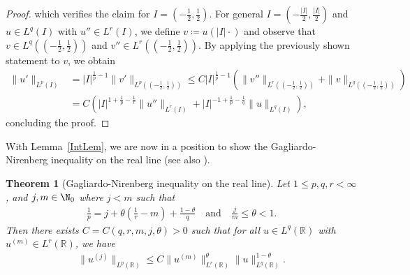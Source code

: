 \documentclass{article}
\numberwithin{figure}{section}
\newcommand{\R}{\mathbb{R}}
\newtheorem{theorem}{Theorem}[section]
\numberwithin{equation}{section}
\begin{document}
\begin{proof}
which verifies the claim for $I=(-\frac 12 , \frac 12)$. For general $I=(-\frac {|I|}{2}, \frac{|I|}{2})$ and $u \in L^q(I)$ with $u'' \in L^{r}(I)$, we define $v \coloneq  u({|I|} \cdot)$ and observe that $v \in L^q((-\frac 12 , \frac 12))$ and $v'' \in L^{r}((-\frac 12 , \frac 12))$. By applying the previously shown statement to $v$, we obtain
\begin{align} 
    \|u'\|_{L^p(I)} & = |I|^{\frac 1p -1} \| v' \|_{L^p((-\frac 12 , \frac 12))}
    \leq C |I|^{\frac 1p -1} \left( \| v'' \|_{L^r((-\frac 12 , \frac 12))} + \| v \|_{L^q((-\frac 12 , \frac 12))} \right) \\
    & = C \left(|I|^{1+ \frac 1p - \frac 1r} \|u''\|_{L^r(I)} + |I|^{ -1 + \frac 1p -\frac 1q} \|u\|_{L^q(I)} \right),
\end{align}
concluding the proof.
\end{proof}

With Lemma~\ref{IntLem}, we are now in a position to show the Gagliardo-Nirenberg inequality on the real line (see also \cite[Theorem~1.2]{FioForRosSou}).

\begin{theorem}[Gagliardo-Nirenberg inequality on the real line] \label{GagNir_R}
Let $1 \leq p,q,r < \infty$,
and $j,m \in \N_0$ where $j<m$ such that
\begin{align} \label{bedGN_R}
    \frac 1p = j + \theta \left( \frac1r - m \right) + \frac{1-\theta}{q} \quad \text{and} \quad \frac jm \leq \theta < 1.
\end{align}
Then there exists $C=C(q,r,m,j,\theta)>0$ such that for all $u \in L^q(\R)$ with $u^{(m)} \in L^r(\R)$, we have
    \begin{align} \label{eq:GagNirR}
    \|u^{(j)}\|_{L^p(\R)} \leq C \|u^{(m)}\|^{\theta}_{L^r(\R)} \|u\|^{1-\theta}_{L^q(\R)}.
\end{align}
\end{theorem}
\end{document}
